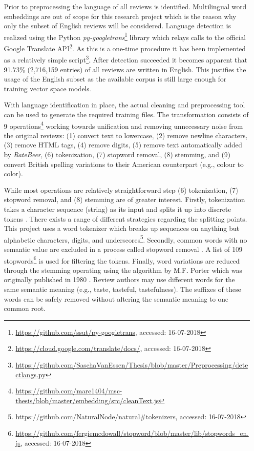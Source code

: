 Prior to preprocessing the language of all reviews is identified.
Multilingual word embeddings are out of scope for this research project which is the reason why only the subset of English reviews will be considered.
Language detection is realized using the Python \textit{py-googletrans}\footnote{\url{https://github.com/ssut/py-googletrans}, accessed: 16-07-2018} library which relays calls to the official Google Translate API\footnote{\url{https://cloud.google.com/translate/docs/}, accessed: 16-07-2018}.
As this is a one-time procedure it has been implemented as a relatively simple script\footnote{\url{https://github.com/SaschaVanEssen/Thesis/blob/master/Preprocessing/detectlangs.py}}.
After detection succeeded it becomes apparent that 91.73\% (2,716,159 entries) of all reviews are written in English.
This justifies the usage of the English subset as the available corpus is still large enough for training vector space models.

With language identification in place, the actual cleaning and preprocessing tool can be used to generate the required training files.
The transformation consists of 9 operations\footnote{\url{https://github.com/marc1404/msc-thesis/blob/master/embedding/src/cleanText.js}} working towards unification and removing unnecessary noise from the original reviews: (1) convert text to lowercase, (2) remove newline characters, (3) remove HTML tags, (4) remove digits, (5) remove text automatically added by \textit{RateBeer}, (6) tokenization, (7) stopword removal, (8) stemming, and (9) convert British spelling variations to their American counterpart (e.g., colour to color).

While most operations are relatively straightforward step (6) tokenization, (7) stopword removal, and (8) stemming are of greater interest.
Firstly, tokenization takes a character sequence (string) as its input and splits it up into discrete tokens \cite{Manning2009}.
There exists a range of different strategies regarding the splitting points.
This project uses a word tokenizer which breaks up sequences on anything but alphabetic characters, digits, and underscores\footnote{\url{https://github.com/NaturalNode/natural\#tokenizers}, accessed: 16-07-2018}.
Secondly, common words with no semantic value are excluded in a process called stopword removal \cite{Manning2009}.
A list of 109 stopwords\footnote{\url{https://github.com/fergiemcdowall/stopword/blob/master/lib/stopwords_en.js}, accessed: 16-07-2018} is used for filtering the tokens.
Finally, word variations are reduced through the stemming operating using the algorithm by M.F. Porter which was originally published in 1980 \cite{Porter1980}.
Review authors may use different words for the same semantic meaning (e.g., taste, tasteful, tastefulness).
The suffixes of these words can be safely removed without altering the semantic meaning to one common root. 

